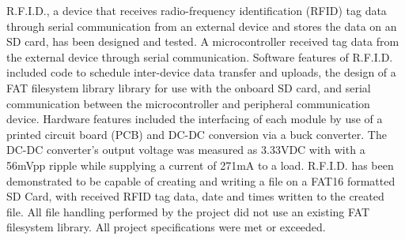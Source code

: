 R.F.I.D., a device that receives radio-frequency identification (RFID) tag data through serial communication from an external device and stores the data on an SD card, has been designed and tested. A microcontroller received tag data from the external device through serial communication. Software features of R.F.I.D. included code to schedule inter-device data transfer and uploads, the design of a FAT filesystem library library for use with the onboard SD card, and serial communication between the microcontroller and peripheral communication device. Hardware features included the interfacing of each module by use of a printed circuit board (PCB) and DC-DC conversion via a buck converter. The DC-DC converter's output voltage was measured as 3.33VDC with with a 56mVpp ripple while supplying a current of 271mA to a load. R.F.I.D. has been demonstrated to be capable of creating and writing a file on a FAT16 formatted SD Card, with received RFID tag data, date and times written to the created file. All file handling performed by the project did not use an existing FAT filesystem library. All project specifications were met or exceeded.





